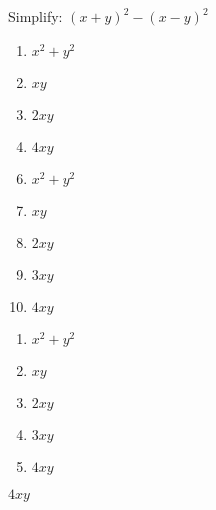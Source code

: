 

 Simplify: $(x+y)^2-(x-y)^2$


\ifsat
	\begin{enumerate}[label=\Alph*)]
		\item   $x^2+y^2$
		\item  $xy$
		\item  $2xy$
		\item  $4xy$%
	\end{enumerate}
\else
\fi

\ifacteven
	\begin{enumerate}[label=\textbf{\Alph*.},itemsep=\fill,align=left]
		\setcounter{enumii}{5}
		\item   $x^2+y^2$
		\item  $xy$
		\item  $2xy$
		\addtocounter{enumii}{1}
		\item   $3xy$
		\item  $4xy$%
	\end{enumerate}
\else
\fi

\ifactodd
	\begin{enumerate}[label=\textbf{\Alph*.},itemsep=\fill,align=left]
		\item   $x^2+y^2$
		\item  $xy$
		\item  $2xy$
		\item   $3xy$
		\item  $4xy$%
	\end{enumerate}
\else
\fi

\ifgridin
  $4xy$%

\else
\fi

